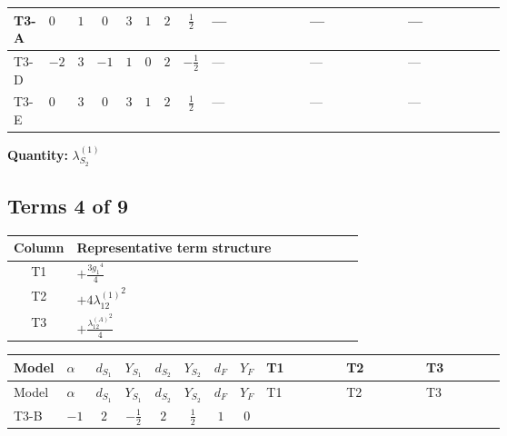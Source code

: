 \documentclass[8pt]{article}
\begin{document}
\begin{landscape}
\begin{longtable}{@{}llcccccc >{\raggedright\arraybackslash}p{0.21\linewidth} >{\raggedright\arraybackslash}p{0.21\linewidth} >{\raggedright\arraybackslash}p{0.21\linewidth}@{}}
\midrule
T3-A & $0$ & $1$ & $0$ & $3$ & $1$ & $2$ & $\frac{1}{2}$ & --- & --- & --- \\
\midrule
T3-D & $-2$ & $3$ & $-1$ & $1$ & $0$ & $2$ & $-\frac{1}{2}$ & --- & --- & --- \\
\midrule
T3-E & $0$ & $3$ & $0$ & $3$ & $1$ & $2$ & $\frac{1}{2}$ & --- & --- & --- \\
\midrule
\bottomrule
\end{longtable}
\clearpage
\noindent\textbf{Quantity: }$\lambda_{S_2}^{(1)}$\par\smallskip
\subsection*{Terms 4 of 9}
\begin{center}
\begin{tabular}{@{}c >{\raggedright\arraybackslash}p{0.82\linewidth}@{}}
\toprule
Column & Representative term structure \\
\midrule
T1 & \(\displaystyle +\frac{3 {g_1}^4}{4}\) \\
\midrule
T2 & \(\displaystyle +4 {\lambda_{12}^{(1)}}^2\) \\
\midrule
T3 & \(\displaystyle +\frac{{\lambda_{12}^{(A)}}^2}{4}\) \\
\midrule
\bottomrule
\end{tabular}
\end{center}
\smallskip
\tiny
\begin{longtable}{@{}llcccccc >{\raggedright\arraybackslash}p{0.21\linewidth} >{\raggedright\arraybackslash}p{0.21\linewidth} >{\raggedright\arraybackslash}p{0.21\linewidth}@{}}
\toprule
Model & $\alpha$ & $d_{S_1}$ & $Y_{S_1}$ & $d_{S_2}$ & $Y_{S_2}$ & $d_F$ & $Y_F$ & T1 & T2 & T3 \\
\midrule
\endfirsthead
\toprule
Model & $\alpha$ & $d_{S_1}$ & $Y_{S_1}$ & $d_{S_2}$ & $Y_{S_2}$ & $d_F$ & $Y_F$ & T1 & T2 & T3 \\
\midrule
\endhead
T3-B & $-1$ & $2$ & $-\frac{1}{2}$ & $2$ & $\frac{1}{2}$ & $1$ & $0$ & \scriptsize\adjustbox{max width=\linewidth}{$\begin{gathered} +\frac{3 {g_1}^4}{4}\end{gathered}$} & \scriptsize\adjustbox{max width=\linewidth}{$\begin{gathered} +4 {\lambda_{12}^{(1)}}^2\end{gathered}$} & \scriptsize\adjustbox{max width=\linewidth}{$\begin{gathered} +\frac{{\lambda_{12}^{(A)}}^2}{4}\end{gathered}$} \\

\end{longtable}
\end{landscape}
\end{document}
